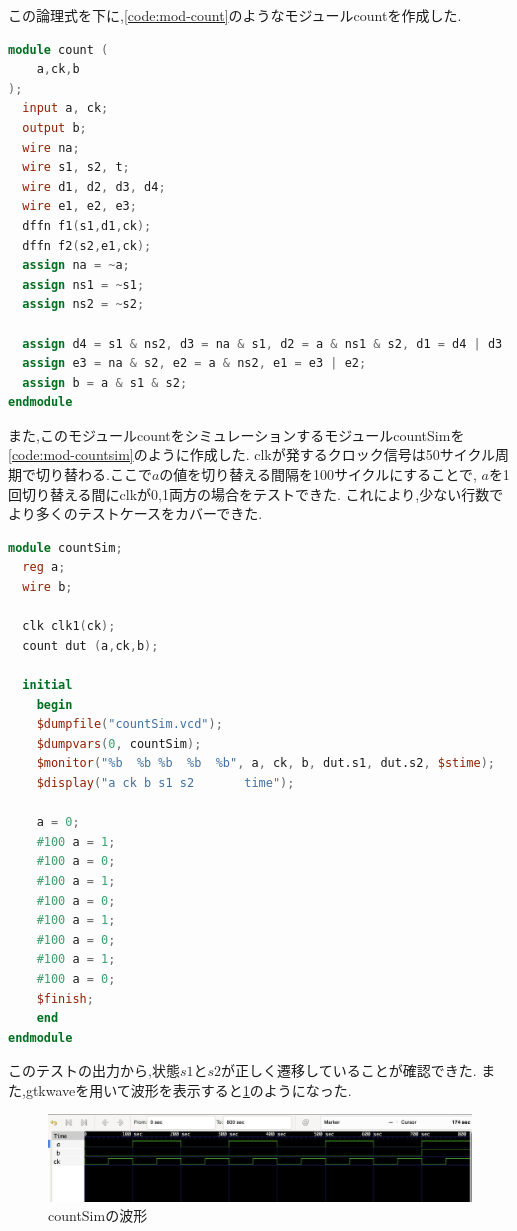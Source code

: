 \documentclass[autodetect-engine, dvi=dvipdfmx, 10pt, a4paper, ja=standard]{bxjsarticle}
\begin{document}
この論理式を下に,\ref{code:mod-count}のようなモジュールcountを作成した.

\begin{lstlisting}[language={Verilog}, caption={モジュールcountのVerilogコード}, label={code:mod-count}]
module count (
    a,ck,b
);
  input a, ck;
  output b;
  wire na;
  wire s1, s2, t;
  wire d1, d2, d3, d4;
  wire e1, e2, e3;
  dffn f1(s1,d1,ck);
  dffn f2(s2,e1,ck);
  assign na = ~a;
  assign ns1 = ~s1;
  assign ns2 = ~s2;

  assign d4 = s1 & ns2, d3 = na & s1, d2 = a & ns1 & s2, d1 = d4 | d3 | d2;
  assign e3 = na & s2, e2 = a & ns2, e1 = e3 | e2;
  assign b = a & s1 & s2;
endmodule
\end{lstlisting}

また,このモジュールcountをシミュレーションするモジュールcountSimを\ref{code:mod-countsim}のように作成した.
clkが発するクロック信号は50サイクル周期で切り替わる.ここで$a$の値を切り替える間隔を100サイクルにすることで,
$a$を1回切り替える間にclkが0,1両方の場合をテストできた.
これにより,少ない行数でより多くのテストケースをカバーできた.

\begin{lstlisting}[language={Verilog}, caption={モジュールcountSimのVerilogコード}, label={code:mod-countsim}]
module countSim;
  reg a;
  wire b;

  clk clk1(ck);
  count dut (a,ck,b);

  initial
    begin
    $dumpfile("countSim.vcd");
    $dumpvars(0, countSim);
    $monitor("%b  %b %b  %b  %b", a, ck, b, dut.s1, dut.s2, $stime);
    $display("a ck b s1 s2       time");

    a = 0;
    #100 a = 1;
    #100 a = 0;
    #100 a = 1;
    #100 a = 0;
    #100 a = 1;
    #100 a = 0;
    #100 a = 1;
    #100 a = 0;
    $finish;
    end
endmodule
\end{lstlisting}

このテストの出力から,状態$s1$と$s2$が正しく遷移していることが確認できた.
また,gtkwaveを用いて波形を表示すると\ref{fig:ex4_wave}のようになった.

\begin{figure}[H]
	\centering
	\includegraphics[width=\textwidth]{ex4_wave.png}
	\caption{countSimの波形}
	\label{fig:ex4_wave}
\end{figure}
\end{document}
